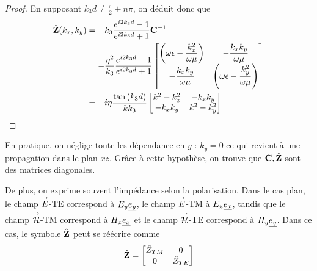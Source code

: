\begin{proof}
            En supposant $k_3d \not = \frac{\pi}{2} + n\pi$, on déduit donc que
            \begin{align}
                \hat {\mathbf{Z}}(k_x,k_y) &=  - k_3 \dfrac{e^{i2k_3d} -1}{e^{i2k_3d} +1} \mathbf{C}^{-1} 
                \\
                &= -\dfrac{\eta^2}{k_3} \dfrac{e^{i2k_3d} -1}{e^{i2k_3d} +1}
                    \begin{bmatrix}
                       \left(\omega\epsilon-\dfrac{k_x^2}{\omega\mu}\right)  & -\dfrac{k_xk_y}{\omega\mu}\\
                        -\dfrac{k_xk_y}{\omega\mu} &  \left(\omega\epsilon-\dfrac{k_y^2}{\omega\mu}\right)
                    \end{bmatrix}
                \\
                &= -i\eta\dfrac{\tan\left(k_3d\right)}{kk_3}
                    \begin{bmatrix}
                       k^2-k_x^2  & -k_xk_y\\
                        -k_xk_y & k^2-k_y^2\\
                    \end{bmatrix}
            \end{align}

        \end{proof}

        En pratique, on néglige toute les dépendance en $y$ : $k_y = 0$ ce qui revient à une propagation dans le plan $xz$. Grâce à cette hypothèse, on trouve que $\mathbf{C}, \hat {\mathbf{Z}}$ sont des matrices diagonales. 

        De plus, on exprime souvent l'impédance selon la polarisation. 
        Dans le cas plan, le champ ${\overset{\rightarrow}{E}}$-TE correspond à ${E_y} \underline{e_y}$, le champ ${\overset{\rightarrow}{E}}$-TM à ${E_x} \underline{e_x}$, tandis que le champ ${\overset{\rightarrow}{\mathcal{H}}}$-TM correspond à ${H_x} \underline{e_x}$ et le champ ${\overset{\rightarrow}{\mathcal{H}}}$-TE correspond à ${H_y} \underline{e_y}$.
        Dans ce cas, le symbole $\hat {\mathbf{Z}}$ peut se réécrire comme
        \begin{equation}
            \hat {\mathbf{Z}} = 
            \begin{bmatrix}
                \hat Z_{TM} & 0 
                \\
                0 & \hat Z_{TE}
            \end{bmatrix}
        \end{equation}

